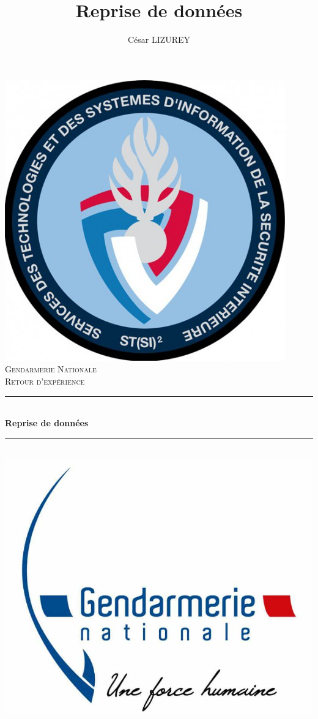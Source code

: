 \documentclass{book}
\title{Reprise de données}
\author{César LIZUREY}
\newcommand{\HRule}{\rule{\linewidth}{0.5mm}}
\begin{document}
\renewcommand\chaptername{}

\begin{titlepage}
  \begin{sffamily}
  \begin{center}

    \includegraphics[scale=0.1]{img/logo-stsi2.jpg}~\\[1.5cm]

    \textsc{\LARGE Gendarmerie Nationale}\\[2cm]

    \textsc{\Large Retour d'expérience}\\[1.5cm]

    \HRule \\[0.4cm]
    { \huge \bfseries Reprise de données\\[0.4cm] }

    \HRule \\[2cm]
    \includegraphics[scale=0.2]{img/logo-officiel-gendarmerie.jpg}
    \\[2cm]


\end{center}
\end{sffamily}
\end{titlepage}
\end{document}
